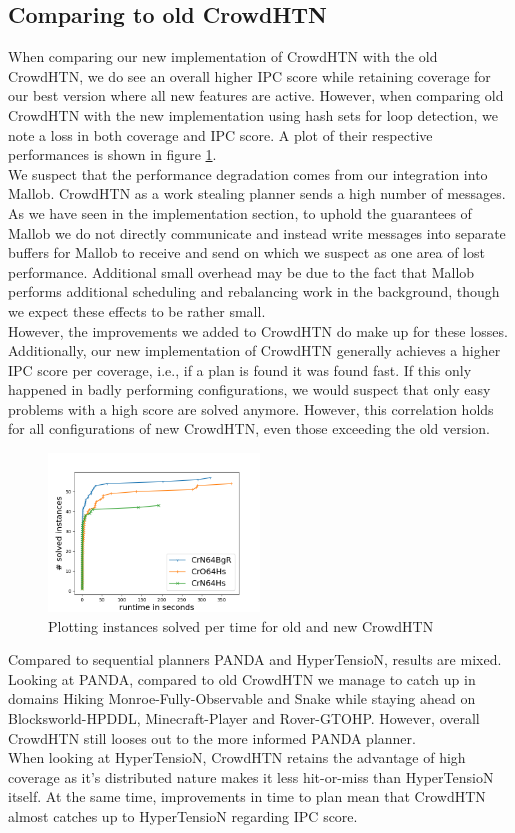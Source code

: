 \subsection{Comparing to old CrowdHTN}
\label{eval: old}
When comparing our new implementation of CrowdHTN with the old CrowdHTN, we do see an overall higher IPC score while retaining coverage for our best version where all new features are active. However, when comparing old CrowdHTN with the new implementation using hash sets for loop detection, we note a loss in both coverage and IPC score. A plot of their respective performances is shown in figure \ref{figure: eval old new}. \\
We suspect that the performance degradation comes from our integration into Mallob. CrowdHTN as a work stealing planner sends a high number of messages. As we have seen in the implementation section, to uphold the guarantees of Mallob we do not directly communicate and instead write messages into separate buffers for Mallob to receive and send on which we suspect as one area of lost performance. Additional small overhead may be due to the fact that Mallob performs additional scheduling and rebalancing work in the background, though we expect these effects to be rather small.\\
However, the improvements we added to CrowdHTN do make up for these losses. Additionally, our new implementation of CrowdHTN generally achieves a higher IPC score per coverage, i.e., if a plan is found it was found fast. If this only happened in badly performing configurations, we would suspect that only easy problems with a high score are solved anymore. However, this correlation holds for all configurations of new CrowdHTN, even those exceeding the old version.
\begin{figure}
	\caption{Plotting instances solved per time for old and new CrowdHTN}
	\label{figure: eval old new}
	\centering
	\includegraphics[width=0.5\textwidth]{images/final/old_new}
\end{figure}
Compared to sequential planners PANDA and HyperTensioN, results are mixed.
Looking at PANDA, compared to old CrowdHTN we manage to catch up in domains Hiking Monroe-Fully-Observable and Snake while staying ahead on Blocksworld-HPDDL, Minecraft-Player and Rover-GTOHP. However, overall CrowdHTN still looses out to the more informed PANDA planner. \\
When looking at HyperTensioN, CrowdHTN retains the advantage of high coverage as it's distributed nature makes it less hit-or-miss than HyperTensioN itself. At the same time, improvements in time to plan mean that CrowdHTN almost catches up to HyperTensioN regarding IPC score.

